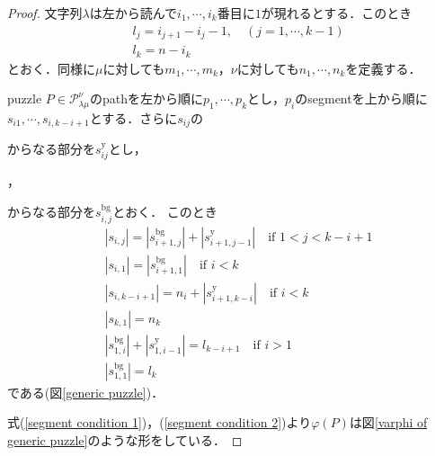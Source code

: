 \begin{proof}
  文字列$\lambda$は左から読んで$i_1,\cdots,i_k$番目に$1$が現れるとする．このとき
  \begin{align*}
    &l_j = i_{j+1} - i_{j} - 1,\quad (j=1,\cdots,k-1)\\
    &l_k = n - i_k
  \end{align*}
  とおく．同様に$\mu$に対しても$m_1,\cdots,m_{k}$，$\nu$に対しても$n_1,\cdots,n_{k}$を定義する．

  puzzle $P\in\mathcal{P}^\nu_{\lambda\mu}$のpathを左から順に$p_1,\cdots,p_k$とし，$p_i$のsegmentを上から順に$s_{i1},\cdots,s_{i,k-i+1}$とする．さらに$s_{ij}$の
  からなる部分を$s_{ij}^{\text{y}}$とし，
  ，
  からなる部分を$s_{i,j}^{\text{bg}}$とおく．
  このとき
  \begin{align}
    &|s_{i,j}| = |s_{i+1,j}^{\text{bg}}| + |s_{i+1,j-1}^{\text{y}}| \quad \text{if } 1 < j < k-i+1\label{segment condition 1}\\
    &|s_{i,1}| = |s_{i+1,1}^{\text{bg}}|\label{segment condition 2}\quad \text{if } i < k\\
    &|s_{i,k-i+1}| = n_i + |s_{i+1, k-i}^{\text{y}}| \quad \text{if } i < k\label{segment condition 3}\\
    &|s_{k,1}| = n_k\label{segment condition 4}\\
    &|s_{1,i}^{\text{bg}}| + |s_{1,i-1}^{\text{y}}| = l_{k-i+1}\quad \text{if } i > 1\label{segment condition 5}\\
    &|s_{1,1}^{\text{bg}}| = l_{k}\label{segment condition 6}
  \end{align}
  である(図\ref{generic puzzle})．

  式(\ref{segment condition 1})，(\ref{segment condition 2})より$\varphi(P)$は図\ref{varphi of generic puzzle}のような形をしている．
  


\end{proof}
